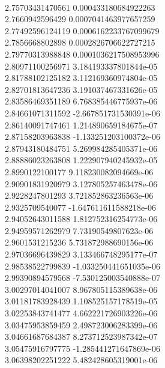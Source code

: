 { \\
2.75703431470561 0.000433180684922263
 \\
2.7660942596429 0.0007041463977657259
 \\
2.77492596124119 0.0006162233767099679
 \\
2.7856668802898 0.0002826706622727215
 \\
2.79770313988848 0.0001036217508953996
 \\
2.80971100256971 3.184193337801844e-05
 \\
2.81788102125182 3.112169360974804e-05
 \\
2.82701813647236 3.191037467331626e-05
 \\
2.83586469351189 6.768385446775937e-06
 \\
2.84661071311592 -2.667851731530391e-06
 \\
2.86140091747461 1.214890659184675e-07
 \\
2.87158203963838 -1.133251203100372e-06
 \\
2.87943180484751 5.269984285405371e-06
 \\
2.88886023263808 1.222907940245932e-05
 \\
2.8990122100177 9.118230082094669e-06
 \\
2.90901831920979 3.127805257463478e-06
 \\
2.9228247801293 3.721852863236563e-06
 \\
2.9325709540077 -1.647611611588218e-06
 \\
2.94052643011588 1.812752316254773e-06
 \\
2.94959571262979 7.73190549807623e-06
 \\
2.9601531215236 5.731872988690156e-06
 \\
2.97036696439829 3.133466748295177e-07
 \\
2.98538522799839 -1.033250441651035e-06
 \\
2.99390894579568 -7.530125003540888e-07
 \\
3.00297014041007 8.967805115389638e-06
 \\
3.01181783928439 1.108525157178519e-05
 \\
3.02253843741477 4.662221726903226e-06
 \\
3.03475953859459 2.498723006283399e-06
 \\
3.04661687684387 8.273712523987342e-07
 \\
3.05475916797775 -1.285441271647869e-06
 \\
3.06398202251222 5.482428605319001e-06
 \\
}
